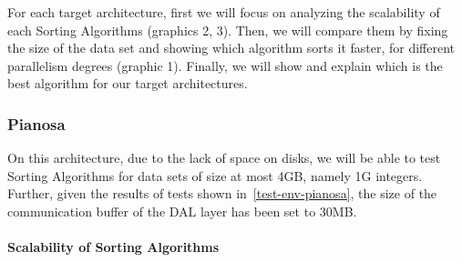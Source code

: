 For each target architecture, first we will focus on analyzing the scalability of each Sorting Algorithms (graphics 2, 3). Then, we will compare them by fixing the size of the data set and showing which algorithm sorts it faster, for different parallelism degrees (graphic 1). Finally, we will show and explain which is the best algorithm for our target architectures. 

\subsubsection{Pianosa}
On this architecture, due to the lack of space on disks, we will be able to test Sorting Algorithms for data sets of size at most 4GB, namely 1G integers. Further, given the results of tests shown in~\ref{test-env-pianosa}, the size of the communication buffer of the DAL layer has been set to 30MB. 

\paragraph{Scalability of Sorting Algorithms}

